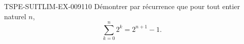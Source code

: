 \begin{exercice}{TSPE-SUITLIM-EX-009}{1}{10}
Démontrer par récurrence que pour tout entier naturel $n$,
\[
  \sum_{k=0}^{n} 2^k = 2^{n+1} - 1.
\]
\end{exercice}
